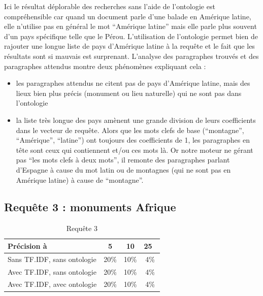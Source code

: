 \documentclass{article}
\begin{document}
Ici le résultat déplorable des recherches sans l’aide de l’ontologie est
compréhensible car quand un document parle d’une balade en Amérique latine, elle
n’utilise pas en général le mot “Amérique latine” mais elle parle plus souvent d’un
pays spécifique telle que le Pérou. L’utilisation de l’ontologie permet bien de
rajouter une longue liste de pays d’Amérique latine à la requête et le fait que les
résultats sont si mauvais est surprenant. L'analyse des paragraphes trouvés et des
paragraphes attendus montre deux phénomènes expliquant cela :

\begin{itemize}

    \item les paragraphes attendus ne citent pas de pays d’Amérique latine, mais des
        lieux bien plus précis (monument ou lieu naturelle) qui ne sont pas dans
        l’ontologie

    \item la liste très longue des pays amènent une grande division de leurs
        coefficients dans le vecteur de requête. Alors que les mots clefs de base
        (“montagne”, “Amérique”, “latine”) ont toujours des coefficients de 1, les
        paragraphes en tête sont ceux qui contiennent et/ou ces mots là. Or notre
        moteur ne gérant pas “les mots clefs à deux mots”, il remonte des paragraphes
        parlant d’Espagne à cause du mot latin ou de montagnes (qui ne sont pas en
        Amérique latine) à cause de “montagne”.

\end{itemize}

\subsection{Requête 3 : \og monuments Afrique \fg }

\begin{table}[h!!]
    \centering
    \caption{Requête 3}
\begin{tabular}{|l|c|c|c|}
    \hline
    Précision à & 5 & 10 & 25 \\
    \hline
    Sans TF.IDF, sans ontologie & 20\% & 10\% & 4\% \\
    \hline
    Avec TF.IDF, sans ontologie & 20\% & 10\% & 4\% \\
    \hline
    Avec TF.IDF, avec ontologie & 20\% & 10\% & 4\% \\
    \hline
\end{tabular}
\end{table}
\end{document}
